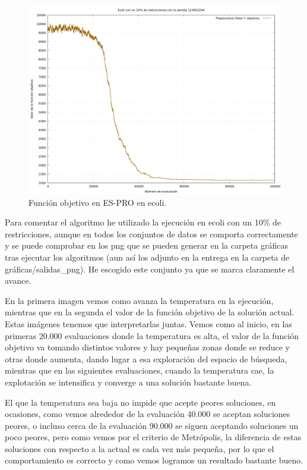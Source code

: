 \documentclass[12pt, spanish]{article}
\begin{document}
\begin{figure}[H]
	\centering
	\includegraphics[scale = 0.35]{es-ecoli-10.png}
	
	\caption{Función objetivo en ES-PRO en ecoli.}
	\label{fig:bmb-cmp1}
\end{figure}


Para comentar el algoritmo he utilizado la ejecución en ecoli con un 10\% de restricciones, aunque en todos los conjuntos de datos se comporta correctamente y se puede comprobar en los png que se pueden generar en la carpeta gráficas tras ejecutar los algoritmos (aun así los adjunto en la entrega en la carpeta de gráficas/salidas\_png). He escogido este conjunto ya que se marca claramente el avance.

En la primera imagen vemos como avanza la temperatura en la ejecución, mientras que en la segunda el valor de la función objetivo de la solución actual. Estas imágenes tenemos que interpretarlas juntas. Vemos como al inicio, en las primeras 20.000 evaluaciones donde la temperatura es alta, el valor de la función objetivo va tomando distintos valores y hay pequeñas zonas donde se reduce y otras donde aumenta, dando lugar a esa exploración del espacio de búsqueda, mientras que en las siguientes evaluaciones, cuando la temperatura cae, la explotación se intensifica y converge a una solución bastante buena.

El que la temperatura sea baja no impide que acepte peores soluciones, en ocasiones, como vemos alrededor de la evaluación 40.000 se aceptan soluciones peores, o incluso cerca de la evaluación 90.000 se siguen aceptando soluciones un poco peores, pero como vemos por el criterio de Metrópolis, la diferencia de estas soluciones con respecto a la actual es cada vez más pequeña, por lo que el comportamiento es correcto y como vemos logramos un resultado bastante bueno.
\end{document}
